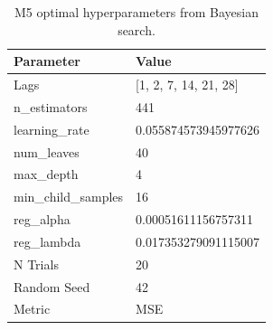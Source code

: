 \begin{table}
\caption{M5 optimal hyperparameters from Bayesian search.}
\label{tab:02_m5_best_params}
\begin{tabular}{ll}
\toprule
Parameter & Value \\
\midrule
Lags & [1, 2, 7, 14, 21, 28] \\
n\_estimators & 441 \\
learning\_rate & 0.055874573945977626 \\
num\_leaves & 40 \\
max\_depth & 4 \\
min\_child\_samples & 16 \\
reg\_alpha & 0.00051611156757311 \\
reg\_lambda & 0.017353279091115007 \\
N Trials & 20 \\
Random Seed & 42 \\
Metric & MSE \\
\bottomrule
\end{tabular}
\end{table}
